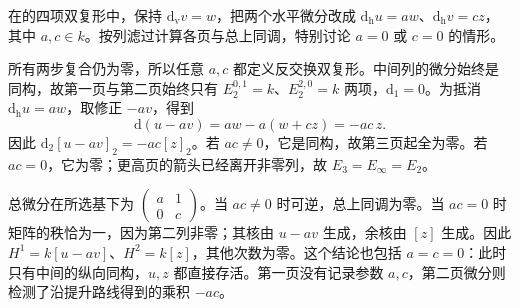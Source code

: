 \begin{exercise}\label{g2:ex:parametric-d2-model}
	在的四项双复形中，保持 \(\mathrm d_{\mathrm v}v=w\)，把两个水平微分改成 \(\mathrm d_{\mathrm h}u=aw\)、\(\mathrm d_{\mathrm h}v=cz\)，其中 \(a,c\in k\)。按列滤过计算各页与总上同调，特别讨论 \(a=0\) 或 \(c=0\) 的情形。
\end{exercise}
\begin{solution}
	所有两步复合仍为零，所以任意 \(a,c\) 都定义反交换双复形。中间列的微分始终是同构，故第一页与第二页始终只有 \(E_2^{0,1}=k\)、\(E_2^{2,0}=k\) 两项，\(\mathrm d_1=0\)。为抵消 \(\mathrm d_{\mathrm h}u=aw\)，取修正 \(-av\)，得到
	\[
		\mathrm d(u-av)=aw-a(w+cz)=-ac\,z.
	\]
	因此 \(\mathrm d_2[u-av]_2=-ac[z]_2\)。若 \(ac\ne0\)，它是同构，故第三页起全为零。若 \(ac=0\)，它为零；更高页的箭头已经离开非零列，故 \(E_3=E_\infty=E_2\)。

	总微分在所选基下为 \(\begin{pmatrix}a&1\\0&c\end{pmatrix}\)。当 \(ac\ne0\) 时可逆，总上同调为零。当 \(ac=0\) 时矩阵的秩恰为一，因为第二列非零；其核由 \(u-av\) 生成，余核由 \([z]\) 生成。因此 \(H^1=k[u-av]\)、\(H^2=k[z]\)，其他次数为零。这个结论也包括 \(a=c=0\)：此时只有中间的纵向同构，\(u,z\) 都直接存活。第一页没有记录参数 \(a,c\)，第二页微分则检测了沿提升路线得到的乘积 \(-ac\)。
\end{solution}
